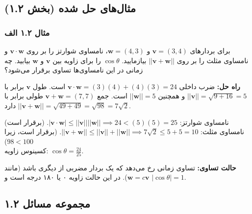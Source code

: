 \documentclass[12pt, a4paper]{book}
\begin{document}
	\subsection*{مثال‌های حل شده (بخش ۱.۲)}
	\subsubsection*{مثال ۱.۲ الف}
	برای بردارهای $\mathbf{v}=(3,4)$ و $\mathbf{w}=(4,3)$، نامساوی شوارتز را بر روی $\mathbf{v} \cdot \mathbf{w}$ و نامساوی مثلث را بر روی $||\mathbf{v}+\mathbf{w}||$ بیازمایید. $\cos\theta$ را برای زاویه بین $\mathbf{v}$ و $\mathbf{w}$ بیابید. چه زمانی در این نامساوی‌ها تساوی برقرار می‌شود؟
	
	\textbf{راه حل:}
	ضرب داخلی $\mathbf{v} \cdot \mathbf{w} = (3)(4)+(4)(3)=24$ است. طول $\mathbf{v}$ برابر با $||\mathbf{v}||=\sqrt{9+16}=5$ و همچنین $||\mathbf{w}||=5$ است. جمع $\mathbf{v}+\mathbf{w}=(7,7)$ طولی برابر با $||\mathbf{v}+\mathbf{w}||=\sqrt{49+49}=\sqrt{98}=7\sqrt{2}$ دارد.
	
	نامساوی شوارتز: $|\mathbf{v} \cdot \mathbf{w}| \le ||\mathbf{v}|| ||\mathbf{w}|| \implies 24 < (5)(5) = 25$. (برقرار است) \\
	نامساوی مثلث: $||\mathbf{v}+\mathbf{w}|| \le ||\mathbf{v}||+||\mathbf{w}|| \implies 7\sqrt{2} \le 5+5=10$. (برقرار است، زیرا $98 < 100$) \\
	کسینوس زاویه: $\cos\theta = \frac{24}{25}$.
	
	\textbf{حالت تساوی:} تساوی زمانی رخ می‌دهد که یک بردار مضربی از دیگری باشد (مانند $\mathbf{w}=c\mathbf{v}$). در این حالت زاویه ۰ یا ۱۸۰ درجه است و $|\cos\theta|=1$.
	
	\subsection*{مجموعه مسائل ۱.۲}
	
\end{document}
